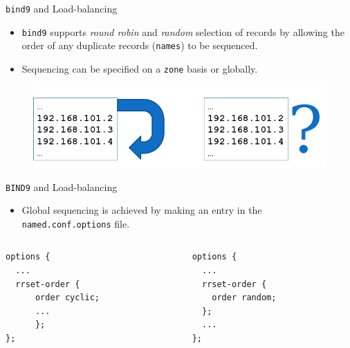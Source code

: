 \documentclass[xcolor=table]{beamer}
\begin{document}
\begin{frame}{\texttt{bind9} and Load-balancing}
  \begin{itemize}
    \item \texttt{bind9} supports \textit{round robin} and \textit{random} selection of records by allowing the order of any duplicate records (\texttt{names}) to be sequenced.
    \item Sequencing can be specified on a \texttt{zone} basis or globally.
  \end{itemize}
  \begin{figure}
    \begin{center}
      \includegraphics[width=1\linewidth]{rrset.png}
    \end{center}
  \end{figure}
\end{frame}

\begin{frame}[fragile]{\texttt{BIND9} and Load-balancing}
  \begin{itemize}
    \item Global sequencing is achieved by making an entry in the \texttt{named.conf.options} file.
  \end{itemize}
  \begin{columns}
    \begin{column}{0.5\textwidth}
      \begin{tcolorbox}
        \lstset{
          basicstyle=\scriptsize\ttfamily,
        }
    \begin{lstlisting}
options {
  ...
  rrset-order {
      order cyclic;
      ...
      };
};
    \end{lstlisting}
      \end{tcolorbox}
    \end{column}
    \begin{column}{0.5\textwidth}
      \begin{tcolorbox}
        \lstset{
          basicstyle=\scriptsize\ttfamily,
        }
    \begin{lstlisting}
options {
  ...
  rrset-order {
    order random;
  };
  ...
};
    \end{lstlisting}
      \end{tcolorbox}
    \end{column}
  \end{columns}
\end{frame}
\end{document}
